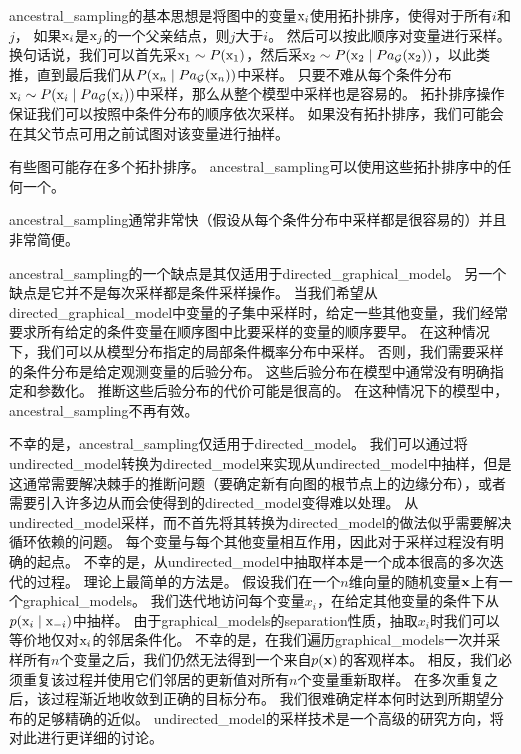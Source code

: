 \gls{ancestral_sampling}的基本思想是将图中的变量$\mathrm{x}_i$使用拓扑排序，使得对于所有$i$和$j$，
如果$\mathrm{x}_i$是$\mathrm{x}_j$的一个父亲结点，则$j$大于$i$。
然后可以按此顺序对变量进行采样。
换句话说，我们可以首先采$\mathrm{x}_1\sim P(\mathrm{x}_1)$，然后采$\mathrm{x}_2\sim P(\mathrm{x}_2\mid Pa_{\mathcal{G}}(\mathrm{x}_2))$，以此类推，直到最后我们从$ P(\mathrm{x}_n\mid Pa_{\mathcal{G}}(\mathrm{x}_n))$中采样。
只要不难从每个条件分布$\mathrm{x}_i\sim P(\mathrm{x}_i\mid Pa_{\mathcal{G}}(\mathrm{x}_i))$中采样，那么从整个模型中采样也是容易的。
拓扑排序操作保证我们可以按照中条件分布的顺序依次采样。
如果没有拓扑排序，我们可能会在其父节点可用之前试图对该变量进行抽样。


有些图可能存在多个拓扑排序。 
\gls{ancestral_sampling}可以使用这些拓扑排序中的任何一个。

\gls{ancestral_sampling}通常非常快（假设从每个条件分布中采样都是很容易的）并且非常简便。


\gls{ancestral_sampling}的一个缺点是其仅适用于\gls{directed_graphical_model}。 
另一个缺点是它并不是每次采样都是条件采样操作。%
当我们希望从\gls{directed_graphical_model}中变量的子集中采样时，给定一些其他变量，我们经常要求所有给定的条件变量在顺序图中比要采样的变量的顺序要早。
在这种情况下，我们可以从模型分布指定的局部条件概率分布中采样。 
否则，我们需要采样的条件分布是给定观测变量的后验分布。
这些后验分布在模型中通常没有明确指定和参数化。 
推断这些后验分布的代价可能是很高的。 
在这种情况下的模型中，\gls{ancestral_sampling}不再有效。



不幸的是，\gls{ancestral_sampling}仅适用于\gls{directed_model}。 
我们可以通过将\gls{undirected_model}转换为\gls{directed_model}来实现从\gls{undirected_model}中抽样，但是这通常需要解决棘手的推断问题（要确定新有向图的根节点上的边缘分布），或者需要引入许多边从而会使得到的\gls{directed_model}变得难以处理。
从\gls{undirected_model}采样，而不首先将其转换为\gls{directed_model}的做法似乎需要解决循环依赖的问题。 
每个变量与每个其他变量相互作用，因此对于采样过程没有明确的起点。
不幸的是，从\gls{undirected_model}中抽取样本是一个成本很高的多次迭代的过程。
理论上最简单的方法是。
假设我们在一个$n$维向量的随机变量$\mathbf{x}$上有一个\gls{graphical_models}。 
我们迭代地访问每个变量$x_i$，在给定其他变量的条件下从$p(\mathrm{x}_i \mid \mathrm{x}_{-i})$中抽样。
由于\gls{graphical_models}的\gls{separation}性质，抽取$x_i$时我们可以等价地仅对$\mathrm{x}_i$的邻居条件化。
不幸的是，在我们遍历\gls{graphical_models}一次并采样所有$n$个变量之后，我们仍然无法得到一个来自$p(\mathbf{x})$的客观样本。
相反，我们必须重复该过程并使用它们邻居的更新值对所有$n$个变量重新取样。
在多次重复之后，该过程渐近地收敛到正确的目标分布。
我们很难确定样本何时达到所期望分布的足够精确的近似。
\gls{undirected_model}的采样技术是一个高级的研究方向，将对此进行更详细的讨论。




